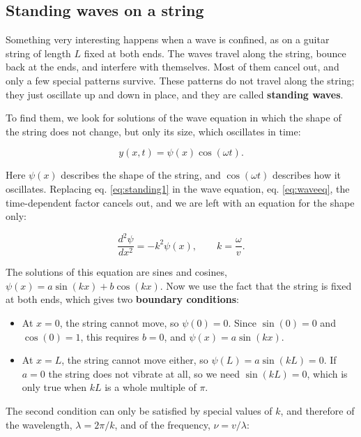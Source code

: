\documentclass[
  english,
  9pt,
]{extbook}
\providecommand{\tightlist}{%
  \setlength{\itemsep}{0pt}\setlength{\parskip}{0pt}}
\theoremstyle{definition}
\theoremstyle{definition}
\theoremstyle{definition}
\theoremstyle{definition}
\theoremstyle{remark}
\begin{document}
\subsection{Standing waves on a string}\label{standing-waves-on-a-string}

Something very interesting happens when a wave is confined, as on a guitar string of length \(L\) fixed at both ends. The waves travel along the string, bounce back at the ends, and interfere with themselves. Most of them cancel out, and only a few special patterns survive. These patterns do not travel along the string; they just oscillate up and down in place, and they are called \textbf{standing waves}.

To find them, we look for solutions of the wave equation in which the shape of the string does not change, but only its size, which oscillates in time:

\begin{equation}
y(x,t) = \psi(x)\cos(\omega t).
\label{eq:standing1}
\end{equation}

Here \(\psi(x)\) describes the shape of the string, and \(\cos(\omega t)\) describes how it oscillates. Replacing eq. \eqref{eq:standing1} in the wave equation, eq. \eqref{eq:waveeq}, the time-dependent factor cancels out, and we are left with an equation for the shape only:

\begin{equation}
\frac{d^2 \psi}{d x^2} = -k^2\psi(x), \qquad k=\frac{\omega}{v}.
\label{eq:standing2}
\end{equation}

The solutions of this equation are sines and cosines, \(\psi(x)=a\sin(kx)+b\cos(kx)\). Now we use the fact that the string is fixed at both ends, which gives two \textbf{boundary conditions}:

\begin{itemize}
\tightlist
\item
  At \(x=0\), the string cannot move, so \(\psi(0)=0\). Since \(\sin(0)=0\) and \(\cos(0)=1\), this requires \(b=0\), and \(\psi(x)=a\sin(kx)\).
\item
  At \(x=L\), the string cannot move either, so \(\psi(L)=a\sin(kL)=0\). If \(a=0\) the string does not vibrate at all, so we need \(\sin(kL)=0\), which is only true when \(kL\) is a whole multiple of \(\pi\).
\end{itemize}

The second condition can only be satisfied by special values of \(k\), and therefore of the wavelength, \(\lambda=2\pi/k\), and of the frequency, \(\nu=v/\lambda\):
\end{document}
